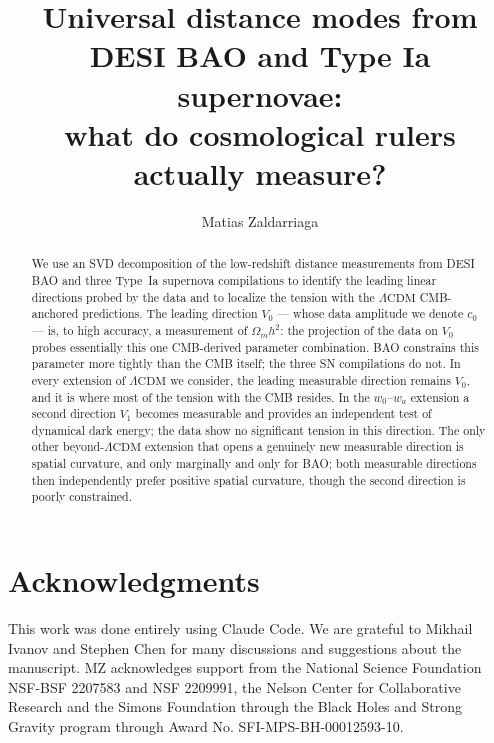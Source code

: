 \documentclass[twocolumn]{aastex631}
\newcommand{\omh}{\ensuremath{\Omega_m h^2}\xspace}
\newcommand{\czero}{\ensuremath{c_0}\xspace}
\newcommand{\LCDM}{\ensuremath{\Lambda\mathrm{CDM}}\xspace}
\newcommand{\wowa}{\ensuremath{w_0\text{--}w_a}\xspace}
\begin{document}
\title{Universal distance modes from DESI BAO and Type Ia supernovae:\\
       what do cosmological rulers actually measure?}

\author{Matias Zaldarriaga}


\begin{abstract}
We use an SVD decomposition of the low-redshift distance measurements from DESI BAO and three Type~Ia supernova compilations to identify the leading linear directions probed by the data and to localize the tension with the \LCDM CMB-anchored predictions. The leading direction $V_0$ — whose data amplitude we denote \czero — is, to high accuracy, a measurement of \omh: the projection of the data on $V_0$ probes essentially this one CMB-derived parameter combination. BAO constrains this parameter more tightly than the CMB itself; the three SN compilations do not. In every extension of \LCDM we consider, the leading measurable direction remains $V_0$, and it is where most of the tension with the CMB resides. In the \wowa extension a second direction $V_1$ becomes measurable and provides an independent test of dynamical dark energy; the data show no significant tension in this direction. The only other beyond-\LCDM extension that opens a genuinely new measurable direction is spatial curvature, and only marginally and only for BAO; both measurable directions then independently prefer positive spatial curvature, though the second direction is poorly constrained.
\end{abstract}











\section*{Acknowledgments}
This work was done entirely using Claude Code. We are grateful to Mikhail Ivanov and Stephen Chen for many discussions and suggestions about the manuscript. MZ acknowledges support from the National Science Foundation NSF-BSF
2207583 and NSF 2209991, the Nelson Center for Collaborative Research and the  Simons Foundation through the Black Holes and Strong Gravity program through Award No. SFI-MPS-BH-00012593-10. 

\appendix





\end{document}
